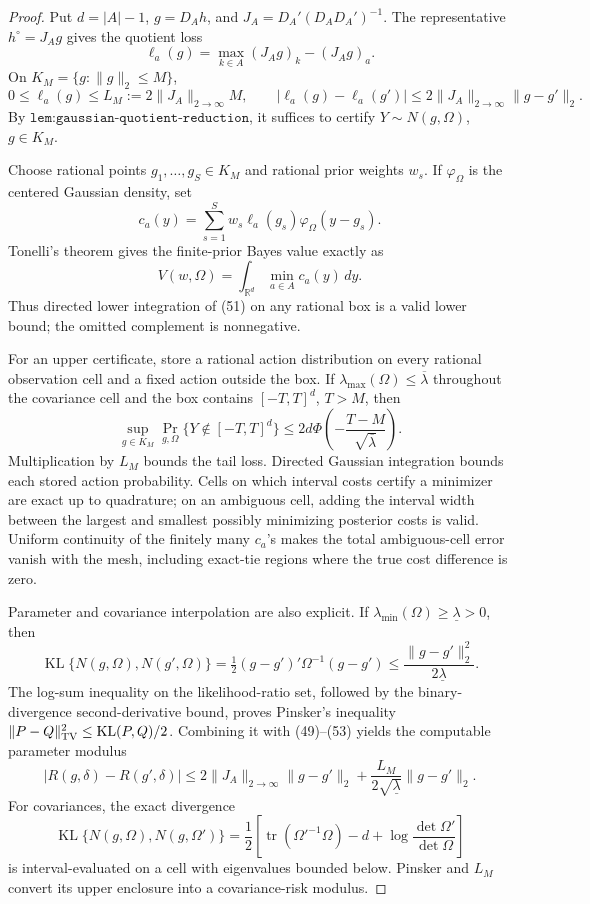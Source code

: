 \documentclass{article}
\begin{document}
\begin{proof}
Put \(d=|A|-1\), \(g=D_Ah\), and \(J_A=D_A'(D_AD_A')^{-1}\).  The representative \(h^\circ=J_Ag\) gives the quotient loss
\[
\ell_a(g)=\max_{k\in A}(J_Ag)_k-(J_Ag)_a.
\]
On \(K_M=\{g:\|g\|_2\leq M\}\),
\[
0\leq\ell_a(g)\leq L_M:=2\|J_A\|_{2\to\infty}M,\qquad
|\ell_a(g)-\ell_a(g')|\leq2\|J_A\|_{2\to\infty}\|g-g'\|_2. \tag{49}
\]
By \(\texttt{lem:gaussian-quotient-reduction}\), it suffices to certify \(Y\sim N(g,\Omega)\), \(g\in K_M\).

Choose rational points \(g_1,\ldots,g_S\in K_M\) and rational prior weights \(w_s\).  If \(\varphi_\Omega\) is the centered Gaussian density, set
\[
c_a(y)=\sum_{s=1}^Sw_s\ell_a(g_s)\varphi_\Omega(y-g_s). \tag{50}
\]
Tonelli's theorem gives the finite-prior Bayes value exactly as
\[
V(w,\Omega)=\int_{\mathbb R^d}\min_{a\in A}c_a(y)\,dy. \tag{51}
\]
Thus directed lower integration of (51) on any rational box is a valid lower bound; the omitted complement is nonnegative.

For an upper certificate, store a rational action distribution on every rational observation cell and a fixed action outside the box.  If \(\lambda_{\max}(\Omega)\leq\overline\lambda\) throughout the covariance cell and the box contains \([-T,T]^d\), \(T>M\), then
\[
\sup_{g\in K_M}\Pr_{g,\Omega}\{Y\notin[-T,T]^d\}
\leq2d\Phi\!\left(-\frac{T-M}{\sqrt{\overline\lambda}}\right). \tag{52}
\]
Multiplication by \(L_M\) bounds the tail loss.  Directed Gaussian integration bounds each stored action probability.  Cells on which interval costs certify a minimizer are exact up to quadrature; on an ambiguous cell, adding the interval width between the largest and smallest possibly minimizing posterior costs is valid.  Uniform continuity of the finitely many \(c_a\)'s makes the total ambiguous-cell error vanish with the mesh, including exact-tie regions where the true cost difference is zero.

Parameter and covariance interpolation are also explicit.  If \(\lambda_{\min}(\Omega)\geq\underline\lambda>0\), then
\[
\operatorname{KL}\{N(g,\Omega),N(g',\Omega)\}
=\tfrac12(g-g')'\Omega^{-1}(g-g')
\leq\frac{\|g-g'\|_2^2}{2\underline\lambda}. \tag{53}
\]
The log-sum inequality on the likelihood-ratio set, followed by the binary-divergence second-derivative bound, proves Pinsker's inequality \(\|P-Q\|_{\rm TV}^2\leq\operatorname{KL}(P,Q)/2\).  Combining it with (49)--(53) yields the computable parameter modulus
\[
|R(g,\delta)-R(g',\delta)|
\leq2\|J_A\|_{2\to\infty}\|g-g'\|_2
+\frac{L_M}{2\sqrt{\underline\lambda}}\|g-g'\|_2. \tag{54}
\]
For covariances, the exact divergence
\[
\operatorname{KL}\{N(g,\Omega),N(g,\Omega')\}
=\frac12\left[\operatorname{tr}(\Omega'^{-1}\Omega)-d+
\log\frac{\det\Omega'}{\det\Omega}\right] \tag{55}
\]
is interval-evaluated on a cell with eigenvalues bounded below.  Pinsker and \(L_M\) convert its upper enclosure into a covariance-risk modulus.


\end{proof}
\end{document}
